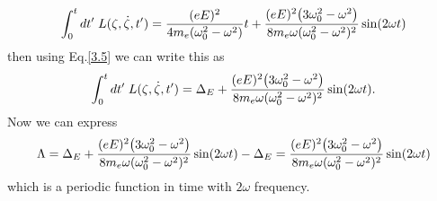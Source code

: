 \begin{equation} \label{3.10}
    \int_0^t dt' \; L(\zeta,\dot{\zeta},t')  =
    \frac{(eE)^2}{4m_e(\omega_0^2 - \omega^2)}t
    +
    \frac{(eE)^2\qty(3\omega_0^2 - \omega^2)}{8m_e\omega(\omega_0^2 - \omega^2)^2}
    \sin(2\omega t)
\end{equation}
then using Eq.\eqref{3.5} we can write this as
\begin{equation} \label{3.11}
    \int_0^t dt' \; L(\zeta,\dot{\zeta},t')  =
    \Delta_E
    +
    \frac{(eE)^2\qty(3\omega_0^2 - \omega^2)}{8m_e\omega(\omega_0^2 - \omega^2)^2}
    \sin(2\omega t).
\end{equation}
Now we can express
\begin{equation} \label{3.12}
    \Lambda  =
    \Delta_E
    +
    \frac{(eE)^2\qty(3\omega_0^2 - \omega^2)}{8m_e\omega(\omega_0^2 - \omega^2)^2}
    \sin(2\omega t) - \Delta_E
    =
    \frac{(eE)^2\qty(3\omega_0^2 - \omega^2)}{8m_e\omega(\omega_0^2 - \omega^2)^2} \sin(2\omega t)
\end{equation}
which is a periodic function in time with $2\omega$ frequency.

